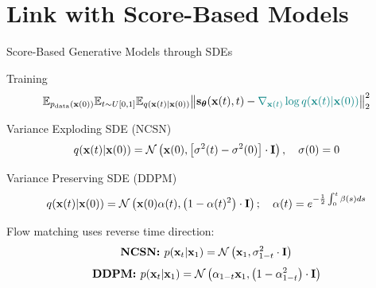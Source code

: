 \documentclass{beamer}
\begin{document}
\section{Link with Score-Based Models}
\begin{frame}{Score-Based Generative Models through SDEs}
	\vspace{-0.3cm}
	\begin{block}{Training}
		\vspace{-0.7cm}
		\[
			\mathbb{E}_{p_{\text{data}}(\mathbf{x}(0))} \mathbb{E}_{t \sim U[0, 1]} \mathbb{E}_{q(\mathbf{x}(t) | \mathbf{x}(0))}\bigl\| \mathbf{s}_{\boldsymbol{\theta}}(\mathbf{x}(t), t) - {\color{teal}\nabla_{\mathbf{x}(t)} \log q(\mathbf{x}(t) | \mathbf{x}(0))} \bigr\|^2_2 
		\]
		\vspace{-0.5cm}
	\end{block}
	\eqpause
	\begin{block}{Variance Exploding SDE (NCSN)}
		\vspace{-0.3cm}
		\[
			q(\mathbf{x}(t) | \mathbf{x}(0)) = \mathcal{N}\left(\mathbf{x}(0), \left[\sigma^2(t) - \sigma^2(0)\right] \cdot \mathbf{I}\right), \quad \sigma(0) =0
		\]
		\vspace{-0.5cm}
	\end{block}
	\begin{block}{Variance Preserving SDE (DDPM)}
		\vspace{-0.5cm}
		\[
			q(\mathbf{x}(t) | \mathbf{x}(0)) = \mathcal{N}\left(\mathbf{x}(0) \alpha(t), \left(1 - \alpha(t)^2\right) \cdot \mathbf{I}\right); \quad \alpha(t) = e^{-\frac{1}{2} \int_0^t \beta(s) ds}
		\]
		\vspace{-0.5cm}
	\end{block}
	\eqpause
	Flow matching uses reverse time direction:
	\[
		\textbf{NCSN: } p(\mathbf{x}_t | \mathbf{x}_1) = \mathcal{N}\left(\mathbf{x}_1, \sigma^2_{1-t} \cdot \mathbf{I}\right)
	\]
	\vspace{-0.5cm}
	\[
		\textbf{DDPM: } p(\mathbf{x}_t | \mathbf{x}_1) = \mathcal{N}\left(\alpha_{1-t} \mathbf{x}_1, \left(1 - \alpha_{1-t}^2\right) \cdot \mathbf{I}\right)
	\]
	\vspace{-0.5cm}
\end{frame}
\end{document}
